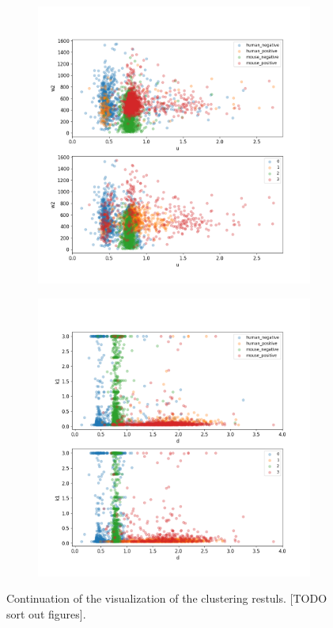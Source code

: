 \begin{figure}
\begin{subfigure}{0.45\textwidth}
	\end{subfigure}
	\hfill
	\begin{subfigure}{0.45\textwidth}
		\includegraphics[width=\textwidth]{fig/seperate_u_w2}
	\end{subfigure}
	\hfill
	\begin{subfigure}{0.45\textwidth}
		\includegraphics[width=\textwidth]{fig/seperate_d_k1}
	\end{subfigure}
	\caption{Continuation of the visualization of the clustering restuls. [TODO sort out figures].}
\label{fig:vis_output_seperate2}
\end{figure}

